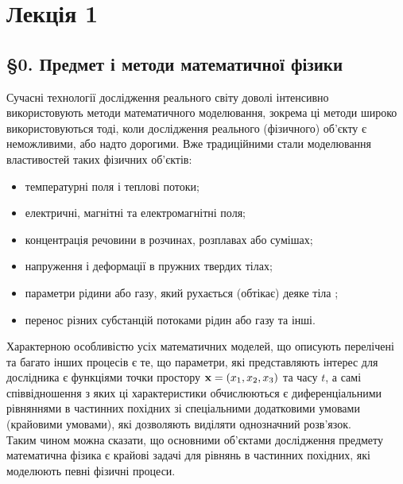 \section*{Лекція 1}

\subsection*{\S0. Предмет і методи математичної фізики}

Сучасні технології дослідження реального світу доволі інтенсивно використовують методи математичного моделювання, зокрема ці методи широко використовуються тоді, коли дослідження реального (фізичного) об’єкту є неможливими, або надто дорогими. Вже традиційними стали моделювання властивостей таких фізичних об’єктів:
\begin{itemize}
	\item температурні поля і теплові потоки;
	\item електричні, магнітні та електромагнітні поля;
	\item концентрація речовини в розчинах, розплавах або сумішах;
	\item напруження і деформації в пружних твердих тілах;
	\item параметри рідини або газу, який рухається (обтікає) деяке тіла ;
	\item перенос різних субстанцій потоками рідин або газу та інші.
\end{itemize}

Характерною особливістю усіх математичних моделей, що описують перелічені та багато інших процесів є те, що параметри, які представляють інтерес для дослідника є функціями точки простору $\bf{x} = (x_1, x_2, x_3)$ та часу $t$, а самі співвідношення з яких ці характеристики обчислюються є диференціальними рівняннями в частинних похідних зі спеціальними додатковими умовами (крайовими умовами), які дозволяють виділяти однозначний розв’язок. \\

Таким чином можна сказати, що основними об’єктами дослідження предмету математична фізика є крайові задачі для рівнянь в частинних похідних, які моделюють певні фізичні процеси. \\

